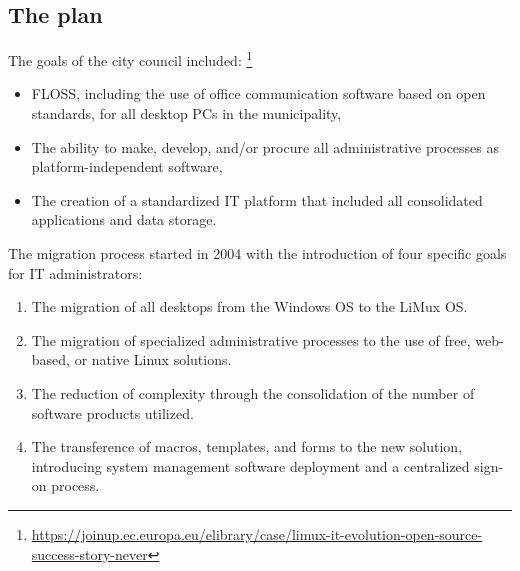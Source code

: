 \subsection{The plan}
The goals of the city council included:
 \footnote{\url{https://joinup.ec.europa.eu/elibrary/case/limux-it-evolution-open-source-success-story-never}}
\begin{itemize}
\item FLOSS, including the use of office communication software based on open standards, for all desktop PCs in the municipality,
\item The ability to make, develop, and/or procure all administrative processes as platform-independent software,
\item The creation of a standardized IT platform that included all consolidated applications and data storage.
\end{itemize}
The migration process started in 2004 with the introduction of four specific goals for IT administrators:
\begin{enumerate}
\item The migration of all desktops from the Windows OS to the LiMux OS.
\item The migration of specialized administrative processes to the use of free, web-based, or native Linux solutions.
 \item The reduction of complexity through the consolidation of the number of software products utilized.
\item The transference of macros, templates, and forms to the new solution, introducing system management software deployment and a centralized sign-on process. 
\end{enumerate}

